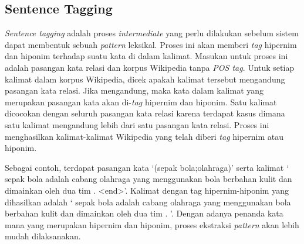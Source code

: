 \subsection{Sentence Tagging}
\textit{Sentence tagging} adalah proses \textit{intermediate} yang perlu dilakukan sebelum sistem dapat membentuk sebuah \textit{pattern} leksikal. Proses ini akan memberi \textit{tag} hipernim dan hiponim terhadap suatu kata di dalam kalimat. Masukan untuk proses ini adalah pasangan kata relasi dan korpus Wikipedia tanpa \textit{POS tag}. Untuk setiap kalimat dalam korpus Wikipedia, dicek apakah kalimat tersebut mengandung pasangan kata relasi. Jika mengandung, maka kata dalam kalimat yang merupakan pasangan kata akan di-\textit{tag} hipernim dan hiponim. Satu kalimat dicocokan dengan seluruh pasangan kata relasi karena terdapat kasus dimana satu kalimat mengandung lebih dari satu pasangan kata relasi. Proses ini menghasilkan kalimat-kalimat Wikipedia yang telah diberi \textit{tag} hipernim atau hiponim.

Sebagai contoh, terdapat pasangan kata `(sepak bola;olahraga)' serta kalimat `{\tagStart} sepak bola adalah cabang olahraga yang menggunakan bola berbahan kulit dan dimainkan oleh dua tim . {\selectfont<end>}'. Kalimat dengan tag hipernim-hiponim yang dihasilkan adalah `{\tagStart} {\tagHyponym}sepak bola{\tagHyponymEnd} adalah cabang {\tagHypernym}olahraga{\tagHypernymEnd} yang menggunakan bola berbahan kulit dan dimainkan oleh dua tim . {\tagEnd}'. Dengan adanya penanda kata mana yang merupakan hipernim dan hiponim, proses ekstraksi \textit{pattern} akan lebih mudah dilaksanakan.

